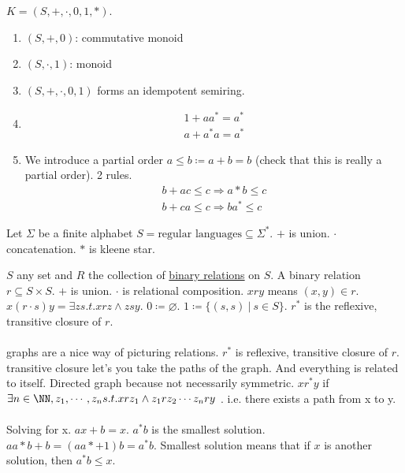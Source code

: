 \documentclass[../598comp.tex]{subfiles}
\begin{document}
\begin{definition}
  $K = (S, +, \cdot, 0, 1, *)$.
  \begin{enumerate}
  \item 
    $(S, +, 0)$: commutative monoid
  \item 
    $(S, \cdot, 1)$: monoid
  \item 
    $(S, +, \cdot, 0, 1)$ forms an idempotent semiring.
  \item 
    \begin{gather*}
      1 + aa^* = a^* \\
      a + a^*a = a^*
    \end{gather*}
  \item 
    We introduce a partial order $a \leq b \coloneqq a + b = b$ (check that this
    is really a partial order). 2 rules.
    \begin{gather*}
      b + ac \leq c \Rightarrow a*b \leq c \\
      b + ca \leq c \Rightarrow ba^* \leq c
    \end{gather*}
  \end{enumerate}
\end{definition}

\begin{example}
  Let $\Sigma$ be a finite alphabet $S = \text{regular languages} \subseteq
  \Sigma^*$. $+$ is union. $\cdot$ concatenation. $*$ is kleene star.
\end{example}

\begin{example}
  $S$ any set and $R$ the collection of \ul{binary relations} on $S$. A binary
  relation $r \subseteq S \times S$. $+$ is union. $\cdot$ is relational
  composition. $x r y$ means $(x, y) \in r$. $x (r \cdot s) y = \exists z s.t. x
  r z \wedge z s y$. $0 \coloneqq \varnothing$. $1 \coloneqq \{(s, s) \ | \ s
  \in S\}$. $r^*$ is the reflexive, transitive closure of $r$.
  \\\\
  graphs are a nice way of picturing relations. $r^*$ is reflexive, transitive
  closure of $r$. transitive closure let's you take the paths of the graph. And
  everything is related to itself. Directed graph because not necessarily
  symmetric. $x r^* y$ if $\exists n \in \NN, z_1, \cdots, z_n s.t. x r z_1
  \wedge z_1 r z_2 \cdots z_n r y$ . i.e. there exists a path from x to y.
  \\\\
  Solving for x. $ax + b = x$. $a^*b$ is the smallest solution. $aa*b + b = (aa*
  + 1)b = a^*b$. Smallest solution means that if $x$ is another solution, then
  $a^*b \leq x$.
\end{example}
\end{document}
